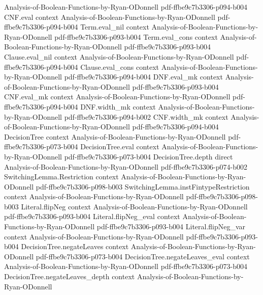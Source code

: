\begin{lemma}
  {Analysis-of-Boolean-Functions-by-Ryan-ODonnell}
  {pdf-ffbe9c7b3306-p094-b004}
\proofstep
  {CNF.eval}
  {context}
  {Analysis-of-Boolean-Functions-by-Ryan-ODonnell}
  {pdf-ffbe9c7b3306-p094-b004}
\proofstep
  {Term.eval_nil}
  {context}
  {Analysis-of-Boolean-Functions-by-Ryan-ODonnell}
  {pdf-ffbe9c7b3306-p093-b004}
\proofstep
  {Term.eval_cons}
  {context}
  {Analysis-of-Boolean-Functions-by-Ryan-ODonnell}
  {pdf-ffbe9c7b3306-p093-b004}
\proofstep
  {Clause.eval_nil}
  {context}
  {Analysis-of-Boolean-Functions-by-Ryan-ODonnell}
  {pdf-ffbe9c7b3306-p094-b004}
\proofstep
  {Clause.eval_cons}
  {context}
  {Analysis-of-Boolean-Functions-by-Ryan-ODonnell}
  {pdf-ffbe9c7b3306-p094-b004}
\proofstep
  {DNF.eval_mk}
  {context}
  {Analysis-of-Boolean-Functions-by-Ryan-ODonnell}
  {pdf-ffbe9c7b3306-p093-b004}
\proofstep
  {CNF.eval_mk}
  {context}
  {Analysis-of-Boolean-Functions-by-Ryan-ODonnell}
  {pdf-ffbe9c7b3306-p094-b004}
\proofstep
  {DNF.width_mk}
  {context}
  {Analysis-of-Boolean-Functions-by-Ryan-ODonnell}
  {pdf-ffbe9c7b3306-p094-b002}
\proofstep
  {CNF.width_mk}
  {context}
  {Analysis-of-Boolean-Functions-by-Ryan-ODonnell}
  {pdf-ffbe9c7b3306-p094-b004}
\proofstep
  {DecisionTree}
  {context}
  {Analysis-of-Boolean-Functions-by-Ryan-ODonnell}
  {pdf-ffbe9c7b3306-p073-b004}
\proofstep
  {DecisionTree.eval}
  {context}
  {Analysis-of-Boolean-Functions-by-Ryan-ODonnell}
  {pdf-ffbe9c7b3306-p073-b004}
\proofstep
  {DecisionTree.depth}
  {direct}
  {Analysis-of-Boolean-Functions-by-Ryan-ODonnell}
  {pdf-ffbe9c7b3306-p074-b002}
\proofstep
  {SwitchingLemma.Restriction}
  {context}
  {Analysis-of-Boolean-Functions-by-Ryan-ODonnell}
  {pdf-ffbe9c7b3306-p098-b003}
\proofstep
  {SwitchingLemma.instFintypeRestriction}
  {context}
  {Analysis-of-Boolean-Functions-by-Ryan-ODonnell}
  {pdf-ffbe9c7b3306-p098-b003}
\proofstep
  {Literal.flipNeg}
  {context}
  {Analysis-of-Boolean-Functions-by-Ryan-ODonnell}
  {pdf-ffbe9c7b3306-p093-b004}
\proofstep
  {Literal.flipNeg_eval}
  {context}
  {Analysis-of-Boolean-Functions-by-Ryan-ODonnell}
  {pdf-ffbe9c7b3306-p093-b004}
\proofstep
  {Literal.flipNeg_var}
  {context}
  {Analysis-of-Boolean-Functions-by-Ryan-ODonnell}
  {pdf-ffbe9c7b3306-p093-b004}
\proofstep
  {DecisionTree.negateLeaves}
  {context}
  {Analysis-of-Boolean-Functions-by-Ryan-ODonnell}
  {pdf-ffbe9c7b3306-p073-b004}
\proofstep
  {DecisionTree.negateLeaves_eval}
  {context}
  {Analysis-of-Boolean-Functions-by-Ryan-ODonnell}
  {pdf-ffbe9c7b3306-p073-b004}
\proofstep
  {DecisionTree.negateLeaves_depth}
  {context}
  {Analysis-of-Boolean-Functions-by-Ryan-ODonnell}

\end{lemma}
